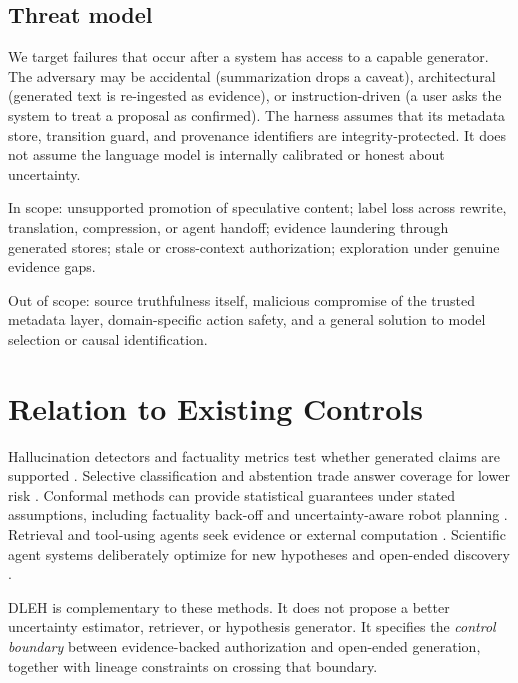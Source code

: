 \documentclass[10pt,twocolumn]{article}
\begin{document}
\subsection{Threat model}
We target failures that occur after a system has access to a capable generator. The adversary may be accidental (summarization drops a caveat), architectural (generated text is re-ingested as evidence), or instruction-driven (a user asks the system to treat a proposal as confirmed). The harness assumes that its metadata store, transition guard, and provenance identifiers are integrity-protected. It does not assume the language model is internally calibrated or honest about uncertainty.

In scope: unsupported promotion of speculative content; label loss across rewrite, translation, compression, or agent handoff; evidence laundering through generated stores; stale or cross-context authorization; exploration under genuine evidence gaps.

Out of scope: source truthfulness itself, malicious compromise of the trusted metadata layer, domain-specific action safety, and a general solution to model selection or causal identification.

\section{Relation to Existing Controls}
Hallucination detectors and factuality metrics test whether generated claims are supported \cite{manakul2023selfcheckgpt,farquhar2024detecting,min2023factscore}. Selective classification and abstention trade answer coverage for lower risk \cite{geifman2017selective,madhusudhan2025llms,kirichenko2025abstentionbench}. Conformal methods can provide statistical guarantees under stated assumptions, including factuality back-off and uncertainty-aware robot planning \cite{mohri2024conformal,ren2023robots}. Retrieval and tool-using agents seek evidence or external computation \cite{lewis2020rag,schick2023toolformer,yao2023react}. Scientific agent systems deliberately optimize for new hypotheses and open-ended discovery \cite{lu2024aiscientist,gottweis2025aicoscientist,alkan2025survey}.

DLEH is complementary to these methods. It does not propose a better uncertainty estimator, retriever, or hypothesis generator. It specifies the \emph{control boundary} between evidence-backed authorization and open-ended generation, together with lineage constraints on crossing that boundary.
\end{document}
